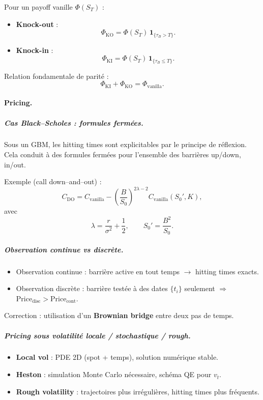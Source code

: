 \documentclass[11pt,a4paper]{article}
\newcommand{\1}{\mathbf{1}}
\begin{document}
Pour un payoff vanille $\Phi(S_T)$ :

\begin{itemize}
  \item \textbf{Knock-out} :
  \[
  \Phi_{\mathrm{KO}} = \Phi(S_T)\, \mathbf{1}_{\{\tau_B > T\}}.
  \]

  \item \textbf{Knock-in} :
  \[
  \Phi_{\mathrm{KI}} = \Phi(S_T)\, \mathbf{1}_{\{\tau_B \le T\}}.
  \]
\end{itemize}

Relation fondamentale de parité :
\[
\Phi_{\mathrm{KI}} + \Phi_{\mathrm{KO}} = \Phi_{\text{vanilla}}.
\]

\paragraph{Pricing.}

\subparagraph{Cas Black--Scholes : formules fermées.}
Sous un GBM, les hitting times sont explicitables par le principe de
réflexion. Cela conduit à des formules fermées pour l'ensemble des barrières
up/down, in/out.

Exemple (call down--and--out) :
\[
C_{\mathrm{DO}}
= C_{\mathrm{vanilla}}
  - \left( \frac{B}{S_0} \right)^{2\lambda - 2}
    C_{\mathrm{vanilla}}(S_0', K),
\]
avec
\[
\lambda = \frac{r}{\sigma^2} + \frac12,
\qquad
S_0' = \frac{B^2}{S_0}.
\]

\subparagraph{Observation continue vs discrète.}
\begin{itemize}
  \item Observation continue : barrière active en tout temps $\rightarrow$ hitting times exacts.
  \item Observation discrète : barrière testée à des dates $\{t_i\}$ seulement
        $\Rightarrow$
        \(
        \mathrm{Price}_{\mathrm{disc}}
        >
        \mathrm{Price}_{\mathrm{cont}}
        \).
\end{itemize}

Correction : utilisation d'un \textbf{Brownian bridge} entre deux pas de temps.

\subparagraph{Pricing sous volatilité locale / stochastique / rough.}

\begin{itemize}
  \item \textbf{Local vol} : PDE 2D (spot + temps), solution numérique stable.
  \item \textbf{Heston} : simulation Monte Carlo nécessaire, schéma QE pour $v_t$.
  \item \textbf{Rough volatility} : trajectoires plus irrégulières, hitting times plus fréquents.
\end{itemize}
\end{document}
